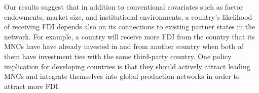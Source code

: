 \documentclass[reqno,onecolumn,letterpaper,12pt]{article}
\begin{document}
Our results suggest that in addition to conventional covariates such as factor endowments, market size, and institutional environments, a country's likelihood of receiving FDI depends also on its connections to existing partner states in the network. For example, a country will receive more FDI from the country that its MNCs have have already invested in and from another country when both of them have investment ties with the same third-party country. One policy implication for developing countries is that they should actively attract leading MNCs and integrate themselves into global production networks in order to attract more FDI.

\end{document}
